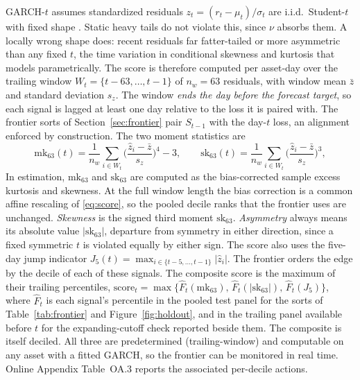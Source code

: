 \documentclass[11pt]{article}
\theoremstyle{remark}
\begin{document}
GARCH-$t$ assumes standardized residuals $z_t = (r_t - \mu_t)/\sigma_t$
are i.i.d.\ Student-$t$ with fixed shape \citep{bollerslev1987}. Static heavy tails do not violate this, since $\nu$ absorbs them. A locally wrong shape does: recent residuals far fatter-tailed or more asymmetric than any fixed $t$, the time variation in conditional skewness and kurtosis that \citet{hansen1994ARCD} models parametrically. The score is therefore computed per asset-day over the trailing window $W_t = \{t-63,\dots,t-1\}$ of $n_w = 63$ residuals, with window mean $\bar{z}$ and standard deviation $s_z$. The window \emph{ends the day before the forecast target}, so each signal is lagged at least one day relative to the loss it is paired with. The frontier sorts of Section~\ref{sec:frontier} pair $S_{t-1}$ with the day-$t$ loss, an alignment enforced by construction. The two moment statistics are
\begin{equation}
\mathrm{mk}_{63}(t) = \frac{1}{n_w}\sum_{i\in W_t}
\Big(\frac{\widehat{z}_i - \bar{z}}{s_z}\Big)^{4} - 3,
\qquad
\mathrm{sk}_{63}(t) = \frac{1}{n_w}\sum_{i\in W_t}
\Big(\frac{\widehat{z}_i - \bar{z}}{s_z}\Big)^{3},
\label{eq:score}
\end{equation}
In estimation, $\mathrm{mk}_{63}$ and $\mathrm{sk}_{63}$ are computed as
the bias-corrected sample excess kurtosis and skewness. At the full
window length the bias correction is a common affine rescaling of
\eqref{eq:score}, so the pooled decile ranks that the frontier uses are
unchanged.
\emph{Skewness} is the signed third moment $\mathrm{sk}_{63}$. \emph{Asymmetry} always means its absolute value $|\mathrm{sk}_{63}|$, departure from symmetry in either direction, since a fixed symmetric $t$ is violated equally by either sign. The score also uses the five-day jump indicator
$J_5(t) = \max_{i \in \{t-5,\dots,t-1\}} |\widehat{z}_i|$. The frontier
orders the edge by the decile of each of these signals. The composite score is the maximum of their trailing percentiles, $\mathrm{score}_t=\max\{\widehat{F}_t(\mathrm{mk}_{63}),\, \widehat{F}_t(|\mathrm{sk}_{63}|),\,\widehat{F}_t(J_5)\}$, where $\widehat{F}_t$ is each signal's percentile in the pooled test panel for the sorts of Table~\ref{tab:frontier} and Figure~\ref{fig:holdout}, and in the trailing panel available before $t$ for the expanding-cutoff check reported beside them. The composite is itself deciled.
All three are predetermined (trailing-window) and computable on any asset with a fitted GARCH, so the frontier can be monitored in real time. Online Appendix Table~OA.3 reports the associated
per-decile actions.
\end{document}
